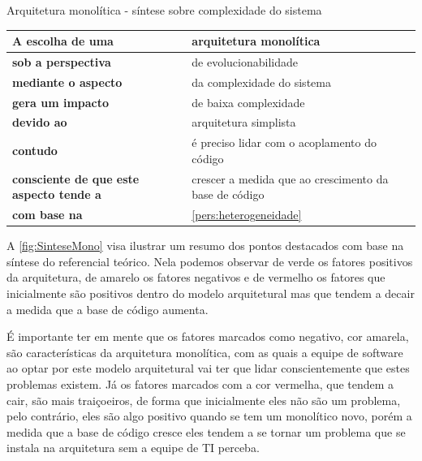 \begin{quadro}
    \caption{Arquitetura monolítica - síntese sobre complexidade do sistema\label{monolitico:sintese-complexidade}}
    \begin{tabularx}{\linewidth}{ | p{5cm} | X | }
    \hline
    \textbf{A escolha de uma}       & arquitetura monolítica \\ \hline
    \textbf{sob a perspectiva}      & de evolucionabilidade \\ \hline
    \textbf{mediante o aspecto}     & da complexidade do sistema \\ \hline
    \textbf{gera um impacto}        & de baixa complexidade \\ \hline
    \textbf{devido ao}              & arquitetura simplista \\ \hline
    \textbf{contudo}                & é preciso lidar com o acoplamento do código \\ \hline
    \textbf{consciente de que este aspecto tende a} & crescer a medida que ao crescimento da base de código\\ \hline
    \textbf{com base na}            & \autoref{pers:heterogeneidade} \\ \hline
    \end{tabularx}
\end{quadro}

\newpage

A \autoref{fig:SinteseMono} visa ilustrar um resumo dos pontos destacados com base na síntese do
referencial teórico. Nela podemos observar de verde os fatores positivos da arquitetura, de amarelo
os fatores negativos e de vermelho os fatores que inicialmente são positivos dentro do modelo
arquitetural mas que tendem a decair a medida que a base de código aumenta.

É importante ter em mente que os fatores marcados como negativo, cor amarela, são características da
arquitetura monolítica, com as quais a equipe de software ao optar por este modelo arquitetural vai
ter que lidar conscientemente que estes problemas existem. Já os fatores marcados com a cor
vermelha, que tendem a cair, são mais traiçoeiros, de forma que inicialmente eles não são um
problema, pelo contrário, eles são algo positivo quando se tem um monolítico novo, porém a medida que
a base de código cresce eles tendem a se tornar um problema que se instala na arquitetura sem a
equipe de \gls{TI} perceba.

